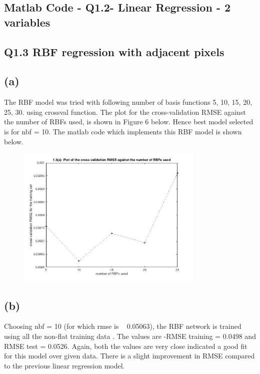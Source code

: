 \documentclass[english]{article}
\begin{document}
\subsection*{Matlab Code - Q1.2- Linear Regression - 2 variables}


\medskip
\subsection*{Q1.3 RBF regression with adjacent pixels}
\subsection*{(a)}
The RBF model was tried with following number of basis functions {5, 10, 15, 20, 25, 30}.
using crossval function. The plot for  the cross-validation RMSE against the number of RBFs used, 
is shown in Figure 6 below. Hence best model selected is for nbf = 10. The matlab code which
implements this RBF model is shown below.
\begin{figure}[h!]
  \caption{}
  \centering
    \includegraphics[width=0.8\textwidth]{fig_1_1_3.jpg}
\end{figure}

\subsection*{(b)} 
Choosing nbf = 10 (for which rmse is ~ 0.05063), the RBF network is trained using all the non-flat training data . The values are -RMSE training = 0.0498  and RMSE test = 0.0526. Again, both the values are very close indicated  a good fit for this model over given data. There is a slight improvement in RMSE compared to the  previous linear regression model.

\end{document}
